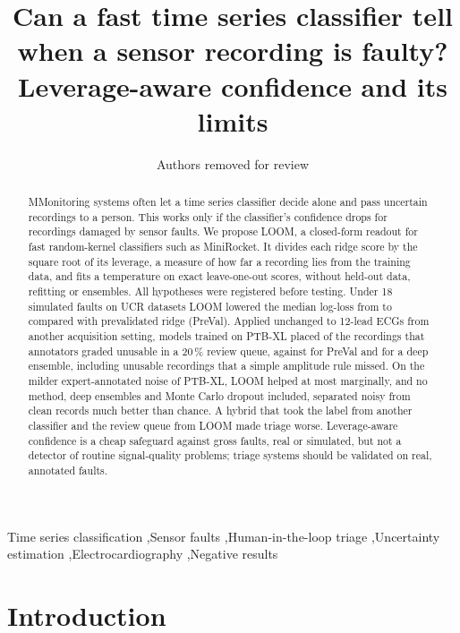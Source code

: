 \documentclass[preprint,12pt,authoryear]{elsarticle}
\begin{document}
\begin{frontmatter}
\title{Can a fast time series classifier tell when a sensor recording is faulty? Leverage-aware confidence and its limits}

\author{Authors removed for review}

\begin{abstract}
MMonitoring systems often let a time series classifier decide alone and pass uncertain recordings to a person. This works only if the classifier's confidence drops for recordings damaged by sensor faults. We propose LOOM, a closed-form readout for fast random-kernel classifiers such as MiniRocket. It divides each ridge score by the square root of its leverage, a measure of how far a recording lies from the training data, and fits a temperature on exact leave-one-out scores, without held-out data, refitting or ensembles. All hypotheses were registered before testing. Under 18 simulated faults on \NDatasets{} UCR datasets LOOM lowered the median log-loss from \NLLFaultsPreVal{} to \NLLFaultsLoom{} compared with prevalidated ridge (PreVal). Applied unchanged to \CincN{} 12-lead ECGs from another acquisition setting, models trained on PTB-XL placed \CincHTwelveCaughtLoom{} of the recordings that annotators graded unusable in a 20\,\% review queue, against \CincHTwelveCaughtPreVal{} for PreVal and \CincCaughtDeepEns{} for a deep ensemble, including unusable recordings that a simple amplitude rule missed. On the milder expert-annotated noise of PTB-XL, LOOM helped at most marginally, and no method, deep ensembles and Monte Carlo dropout included, separated noisy from clean records much better than chance. A hybrid that took the label from another classifier and the review queue from LOOM made triage worse. Leverage-aware confidence is a cheap safeguard against gross faults, real or simulated, but not a detector of routine signal-quality problems; triage systems should be validated on real, annotated faults.
\end{abstract}

\begin{keyword}
Time series classification \sep Sensor faults \sep Human-in-the-loop triage \sep Uncertainty estimation \sep Electrocardiography \sep Negative results
\end{keyword}

\end{frontmatter}

\section{Introduction}\label{sec:intro}
\end{document}
